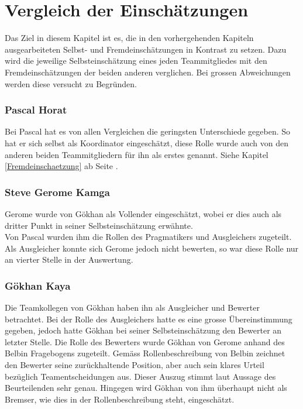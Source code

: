 
\chapter{Vergleich der Einschätzungen}
Das Ziel in diesem Kapitel ist es, die in den vorhergehenden Kapiteln ausgearbeiteten Selbst- und Fremdeinschätzungen in Kontrast zu setzen. Dazu wird die jeweilige Selbsteinschätzung eines jeden Teammitgliedes mit den Fremdeinschätzungen der beiden anderen verglichen. Bei grossen Abweichungen werden diese versucht zu Begründen.   
\subsection*{Pascal Horat}
Bei Pascal hat es von allen Vergleichen die geringsten Unterschiede gegeben. So hat er sich selbst als Koordinator eingeschätzt, diese Rolle wurde auch von den anderen beiden Teammitgliedern für ihn als erstes genannt. Siehe Kapitel \ref{Fremdeinschaetzung} ab Seite \pageref{Fremdeinschaetzung}. 

\subsection*{Steve Gerome Kamga}
Gerome wurde von Gökhan als Vollender eingeschätzt, wobei er dies auch als dritter Punkt in seiner Selbsteinschätzung erwähnte. \\
Von Pascal wurden ihm die Rollen des Pragmatikers und Ausgleichers zugeteilt. Als Ausgleicher konnte sich Gerome jedoch nicht bewerten, so war diese Rolle nur an vierter Stelle in der Auswertung.

\subsection*{Gökhan Kaya}
Die Teamkollegen von Gökhan haben ihn als Ausgleicher und Bewerter betrachtet. Bei der Rolle des Ausgleichers hatte es eine grosse Übereinstimmung gegeben, jedoch hatte Gökhan bei seiner Selbsteinschätzung den Bewerter an letzter Stelle. Die Rolle des Bewerters wurde Gökhan von Gerome anhand des Belbin Fragebogens zugeteilt. Gemäss Rollenbeschreibung von Belbin zeichnet den Bewerter seine zurückhaltende Position, aber auch sein klares Urteil bezüglich Teamentscheidungen aus. Dieser Auszug stimmt laut Aussage des Beurteilenden sehr genau. Hingegen wird Gökhan von ihm überhaupt nicht als Bremser, wie dies in der Rollenbeschreibung steht, eingeschätzt.